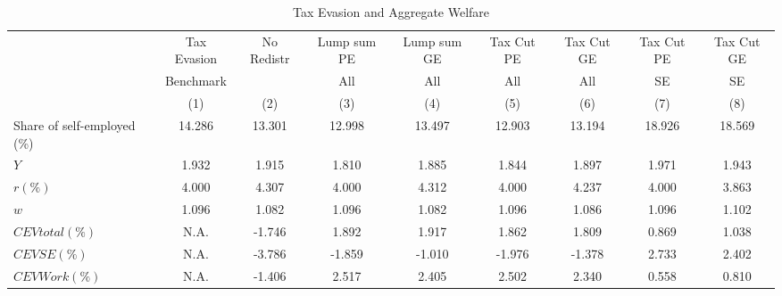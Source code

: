 \documentclass[a4paper,10pt]{article}
\begin{document}
 
\begin{sidewaystable}[htbp] \centering 
\caption{Tax Evasion and Aggregate Welfare} 
\label{table:aggregates} 
\begin{tabular}{l c c c c c c c c} \hline 
& Tax Evasion  & No Redistr  & Lump sum PE & Lump sum GE &  Tax Cut PE & Tax Cut GE & Tax Cut PE & Tax Cut GE \\ 
& Benchmark    &             & All         & All         &  All        & All        & SE      & SE            \\& (1)          &     (2)     & (3)         & (4)         & (5)         & (6)        & (7)     & (8)           \\\hline \hline 
Share of self-employed (\%) &   14.286 &   13.301 &   12.998 &   13.497 &   12.903 &   13.194 &   18.926 &   18.569 \\ 
$Y$                &    1.932 &    1.915 &    1.810 &    1.885 &    1.844 &    1.897 &    1.971 &    1.943 \\ 
$r(\%)$          &    4.000 &    4.307 &    4.000 &    4.312 &    4.000 &    4.237 &    4.000 &    3.863 \\ 
$w$                &    1.096 &    1.082 &    1.096 &    1.082 &    1.096 &    1.086 &    1.096 &    1.102 \\ 
$CEV total(\%)$  & N.A.    &   -1.746 &    1.892 &    1.917 &    1.862 &    1.809 &    0.869 &    1.038 \\ 
$CEV SE(\%)$     & N.A.    &   -3.786 &   -1.859 &   -1.010 &   -1.976 &   -1.378 &    2.733 &    2.402 \\ 
$CEV Work(\%)$   & N.A.    &   -1.406 &    2.517 &    2.405 &    2.502 &    2.340 &    0.558 &    0.810 \\ 
\hline  
 \end{tabular} 
\end{sidewaystable} 
\end{document}

